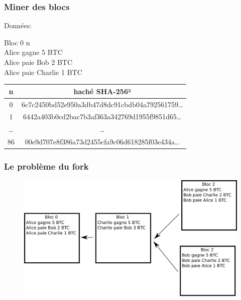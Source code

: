 \documentclass{beamer}
\begin{document}
\begin{frame}

\frametitle{Miner des blocs}

Données:\\
\vspace{0.5cm}

Bloc 0 n\\
Alice gagne 5 BTC\\
Alice paie Bob 2 BTC\\
Alice paie Charlie 1 BTC\\

\vspace{0.5cm}
\begin{tabular}{| c | c |}
	\hline
   n     & haché SHA-256²\\ \hline
   0     & 6c7c2450bd52e950a3db47d8dc91cbdb04a792561759\dots \\ \hline
   1     & 6442a403b0cd2bac7b3af363a342769d1955f9851d65\dots \\ \hline
   \dots & \dots \\ \hline
   86    & 00e9d707e8f386a73d2455cfa9c06d618285f03e434a\dots\\
	\hline
 \end{tabular}

\end{frame}


\begin{frame}

\frametitle{Le problème du fork}

\begin{figure}[H]
		\includegraphics[width=\linewidth]{illustrationsSoutenance/fork.png}
	\end{figure}

\end{frame}
\end{document}
